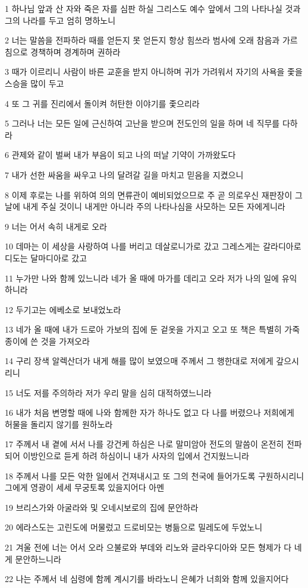 \par 1 하나님 앞과 산 자와 죽은 자를 심판 하실 그리스도 예수 앞에서 그의 나타나실 것과 그의 나라를 두고 엄히 명하노니
\par 2 너는 말씀을 전파하라 때를 얻든지 못 얻든지 항상 힘쓰라 범사에 오래 참음과 가르침으로 경책하며 경계하며 권하라
\par 3 때가 이르리니 사람이 바른 교훈을 받지 아니하며 귀가 가려워서 자기의 사욕을 좇을 스승을 많이 두고
\par 4 또 그 귀를 진리에서 돌이켜 허탄한 이야기를 좇으리라
\par 5 그러나 너는 모든 일에 근신하여 고난을 받으며 전도인의 일을 하며 네 직무를 다하라
\par 6 관제와 같이 벌써 내가 부음이 되고 나의 떠날 기약이 가까왔도다
\par 7 내가 선한 싸움을 싸우고 나의 달려갈 길을 마치고 믿음을 지켰으니
\par 8 이제 후로는 나를 위하여 의의 면류관이 예비되었으므로 주 곧 의로우신 재판장이 그 날에 내게 주실 것이니 내게만 아니라 주의 나타나심을 사모하는 모든 자에게니라
\par 9 너는 어서 속히 내게로 오라
\par 10 데마는 이 세상을 사랑하여 나를 버리고 데살로니가로 갔고 그레스게는 갈라디아로 디도는 달마디아로 갔고
\par 11 누가만 나와 함께 있느니라 네가 올 때에 마가를 데리고 오라 저가 나의 일에 유익하니라
\par 12 두기고는 에베소로 보내었노라
\par 13 네가 올 때에 내가 드로아 가보의 집에 둔 겉옷을 가지고 오고 또 책은 특별히 가죽 종이에 쓴 것을 가져오라
\par 14 구리 장색 알렉산더가 내게 해를 많이 보였으매 주께서 그 행한대로 저에게 갚으시리니
\par 15 너도 저를 주의하라 저가 우리 말을 심히 대적하였느니라
\par 16 내가 처음 변명할 때에 나와 함께한 자가 하나도 없고 다 나를 버렸으나 저희에게 허물을 돌리지 않기를 원하노라
\par 17 주께서 내 곁에 서서 나를 강건케 하심은 나로 말미암아 전도의 말씀이 온전히 전파되어 이방인으로 듣게 하려 하심이니 내가 사자의 입에서 건지웠느니라
\par 18 주께서 나를 모든 악한 일에서 건져내시고 또 그의 천국에 들어가도록 구원하시리니 그에게 영광이 세세 무궁토록 있을지어다 아멘
\par 19 브리스가와 아굴라와 및 오네시보로의 집에 문안하라
\par 20 에라스도는 고린도에 머물렀고 드로비모는 병듦으로 밀레도에 두었노니
\par 21 겨울 전에 너는 어서 오라 으불로와 부데와 리노와 글라우디아와 모든 형제가 다 네게 문안하느니라
\par 22 나는 주께서 네 심령에 함께 계시기를 바라노니 은혜가 너희와 함께 있을지어다


